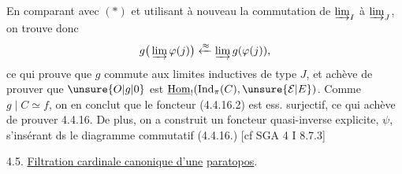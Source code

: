 En comparant avec $(\ast)$ et utilisant à nouveau  la commutation de $\varinjlim_I$ à $\varinjlim_J$, on trouve donc
\[
g\big(\varinjlim\varphi(j)\big)\xleftarrow{\approx}\varinjlim g(\varphi(j)),
\]
ce qui  prouve que $g$  commute aux limites inductives de type $J$, et achève de prouver que $\unsure{O|g|0}$ est $\underline{\mathrm{Hom}}_{!}(\operatorname{Ind}_\pi(C),\unsure{\mathcal E|E})$. Comme $g\mid C\simeq f$, on  en conclut que le foncteur (4.4.16.2) est ess. surjectif, ce qui achève de prouver 4.4.16. De plus, on a construit un foncteur quasi-inverse explicite, $\psi$,
s'insérant ds le diagramme commutatif
(4.4.16.)
[cf SGA 4 I 8.7.3]

4.5. \uline{Filtration cardinale canonique d'une}  \uline{paratopos}.

